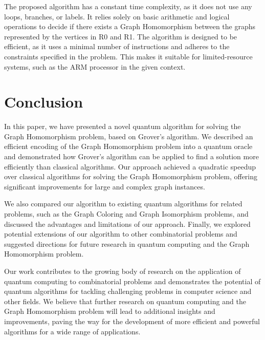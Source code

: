 The proposed algorithm has a constant time complexity, as it does not use any loops, branches, or labels. It relies solely on basic arithmetic and logical operations to decide if there exists a Graph Homomorphism between the graphs represented by the vertices in R0 and R1. The algorithm is designed to be efficient, as it uses a minimal number of instructions and adheres to the constraints specified in the problem. This makes it suitable for limited-resource systems, such as the ARM processor in the given context.

\section{Conclusion}

In this paper, we have presented a novel quantum algorithm for solving the Graph Homomorphism problem, based on Grover's algorithm. We described an efficient encoding of the Graph Homomorphism problem into a quantum oracle and demonstrated how Grover's algorithm can be applied to find a solution more efficiently than classical algorithms. Our approach achieved a quadratic speedup over classical algorithms for solving the Graph Homomorphism problem, offering significant improvements for large and complex graph instances.

We also compared our algorithm to existing quantum algorithms for related problems, such as the Graph Coloring and Graph Isomorphism problems, and discussed the advantages and limitations of our approach. Finally, we explored potential extensions of our algorithm to other combinatorial problems and suggested directions for future research in quantum computing and the Graph Homomorphism problem.

Our work contributes to the growing body of research on the application of quantum computing to combinatorial problems and demonstrates the potential of quantum algorithms for tackling challenging problems in computer science and other fields. We believe that further research on quantum computing and the Graph Homomorphism problem will lead to additional insights and improvements, paving the way for the development of more efficient and powerful algorithms for a wide range of applications.

